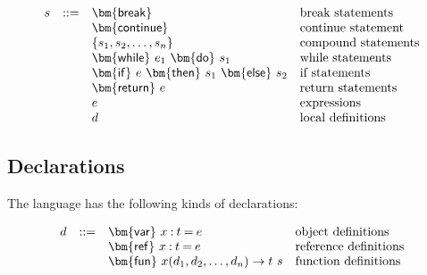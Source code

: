 \documentclass[11pt]{article}
\newcommand{\mathsc}[1]{\bm{\mathsf{#1}}}
\newcommand{\stmtbreak}{\ensuremath{\mathsc{break}}\xspace}
\newcommand{\stmtcont}{\ensuremath{\mathsc{continue}}\xspace}
\newcommand{\stmtblock}[1]{\ensuremath{\{#1\}}\xspace}
\newcommand{\stmtwhile}[2]{\ensuremath{%
  \mathsc{while}~#1~\mathsc{do}~#2%
  }\xspace}
\newcommand{\stmtif}[3]{\ensuremath{%
  \mathsc{if}~#1~\mathsc{then}~#2~\mathsc{else}~#3%
  }\xspace}
\newcommand{\stmtret}[1]{\ensuremath{%
  \mathsc{return}~#1%
  }\xspace}
\newcommand{\stmtexpr}[1]{\ensuremath{#1}\xspace}
\newcommand{\stmtdecl}[1]{\ensuremath{#1}\xspace}
\newcommand{\decllet}[4]{\ensuremath{%
  \mathsc{#1}~#2\mathbin{:}#3\mathbin{=}#4%
  }\xspace}
\newcommand{\declvar}[3]{\decllet{var}{#1}{#2}{#3}}
\newcommand{\declref}[3]{\decllet{ref}{#1}{#2}{#3}}
\newcommand{\declfn}[4]{\ensuremath{%
  \mathsc{fun}~#1(#2) \rightarrow #3~#4%
  }\xspace}
\begin{document}
\[
\begin{array}{lcll}
s &::=& \stmtbreak              & \text{break statements} \\
  &   & \stmtcont               & \text{continue statement} \\
  &   & \stmtblock{s_1, s_2, \ldots, s_n}
                                & \text{compound statements} \\
  &   & \stmtwhile{e_1}{s_1}    & \text{while statements} \\
  &   & \stmtif{e}{s_1}{s_2}    & \text{if statements} \\
  &   & \stmtret{e}             & \text{return statements} \\
  &   & \stmtexpr{e}            & \text{expressions} \\
  &   & \stmtdecl{d}            & \text{local definitions} \\
\end{array}
\]

\subsection{Declarations}

The language has the following kinds of declarations:

\[
\begin{array}{lcll}
d &::=& \declvar{x}{t}{e}       & \text{object definitions} \\
  &   & \declref{x}{t}{e}       & \text{reference definitions} \\
  &   & \declfn{x}{d_1, d_2, \ldots, d_n}{t}{s}
                                & \text{function definitions} \\
\end{array}
\]






\end{document}
